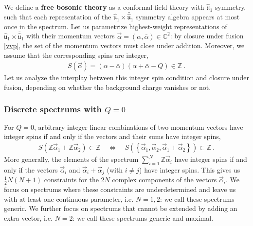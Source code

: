 \documentclass[12pt, a4paper, notitlepage, twoside]{report}
\numberwithin{equation}{section}
\theoremstyle{break}
\begin{document}
We define a \textbf{\boldmath free bosonic theory} as a conformal field theory with $\hat{\mathfrak{u}}_1$ symmetry, such that each representation of the $\hat{\mathfrak{u}}_1 \times \bar{\hat{\mathfrak{u}}}_1$ symmetry algebra appears at most once in the spectrum. Let us parametrize highest-weight representations of $\hat{\mathfrak{u}}_1 \times \bar{\hat{\mathfrak{u}}}_1$ with their momentum vectors $\vec\alpha = (\alpha,\bar\alpha)\in\mathbb{C}^2$: by closure under fusion \eqref{vvp}, the set of the momentum vectors must close under addition. Moreover, we assume that the corresponding spins are integer,
\begin{align}
 S(\vec\alpha) = (\alpha-\bar\alpha)(\alpha+\bar\alpha-Q)\in\mathbb{Z}\ . 
\end{align}
Let us analyze the interplay between this integer spin condition and closure under fusion, depending on whether the background charge vanishes or not.

\subsubsection{Discrete spectrums with $Q=0$}

For $Q=0$, arbitrary integer linear combinations of two momentum vectors have integer spins if and only if the vectors and their sums have integer spins,
\begin{align}
 S\left(\mathbb{Z}\vec\alpha_1 + \mathbb{Z}\vec\alpha_2\right)\subset \mathbb{Z} \quad \iff \quad S\left(\left\{\vec\alpha_1,\vec\alpha_2,\vec\alpha_1+\vec\alpha_2\right\}\right)\subset \mathbb{Z}\ .
\end{align}
More generally, the elements of the spectrum $\sum_{i=1}^N \mathbb{Z}\vec \alpha_i$ have integer spins if and only if the vectors $\vec\alpha_i$ and $\vec\alpha_i+\vec\alpha_j$ (with $i\neq j$) have integer spins. This gives us $\frac12 N(N+1)$ constraints for the $2N$ complex components of the vectors $\vec\alpha_i$. We focus on spectrums where these constraints are underdetermined and leave us with at least one continuous parameter, i.e. $N=1,2$: we call these spectrums generic. We further focus on spectrums that cannot be extended by adding an extra vector, i.e. $N=2$: we call these spectrums generic and maximal.
\end{document}
